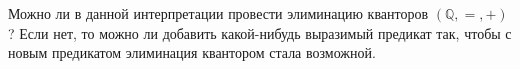 Можно ли в данной интерпретации провести элиминацию кванторов $(\mathbb{Q}, =, +)$? Если нет, то можно ли
добавить какой-нибудь выразимый предикат так, чтобы с новым предикатом элиминация квантором стала
возможной.
